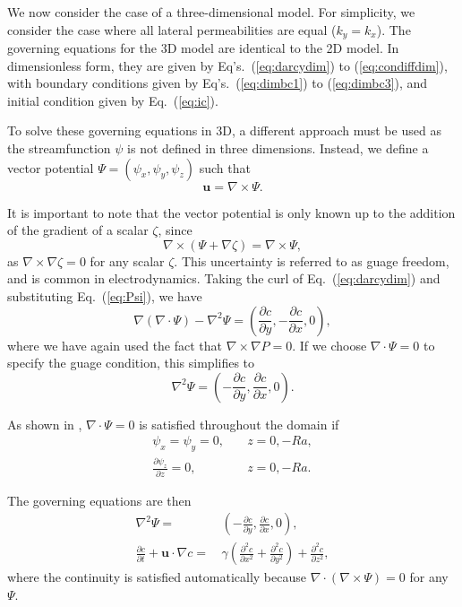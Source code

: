 \documentclass[11pt, a4paper]{csiroreport2012}
\begin{document}
We now consider the case of a three-dimensional model. For simplicity, we consider the case where all lateral permeabilities are equal ($k_y = k_x$). The governing equations for the 3D model are identical to the 2D model. In dimensionless form, they are given by Eq's.~(\ref{eq:darcydim}) to (\ref{eq:condiffdim}), with boundary conditions given by Eq's.~(\ref{eq:dimbc1}) to (\ref{eq:dimbc3}), and initial condition given by Eq.~(\ref{eq:ic}).

To solve these governing equations in 3D, a different approach must be used as the streamfunction $\psi$ is not defined in three dimensions. Instead, we define a vector potential $\Psi = (\psi_x, \psi_y, \psi_z)$ such that
\begin{equation}
\mathbf{u} = \nabla \times \Psi.
\label{eq:Psi}
\end{equation}

It is important to note that the vector potential is only known up to the addition of the gradient of a scalar $\zeta$, since 
\begin{equation}
\nabla \times \left( \Psi + \nabla \zeta \right) = \nabla \times \Psi,
\end{equation}
as $\nabla \times \nabla \zeta = 0$ for any scalar $\zeta$. This uncertainty is referred to as guage freedom, and is common in electrodynamics. Taking the curl of Eq.~(\ref{eq:darcydim}) and substituting Eq.~(\ref{eq:Psi}), we have 
\begin{equation}
\nabla(\nabla \cdot \Psi) - \nabla^2 \Psi = \left(\frac{\partial c}{\partial y}, - \frac{\partial c}{\partial x}, 0\right),
\end{equation}
where we have again used the fact that $\nabla \times \nabla P = 0$. If we choose $\nabla \cdot \Psi = 0$ to specify the guage condition, this simplifies to
\begin{equation}
\nabla^2 \Psi = \left(-\frac{\partial c}{\partial y},  \frac{\partial c}{\partial x}, 0\right).
\label{eq:poisson}
\end{equation}

As shown in \cite{E1997}, $\nabla \cdot \Psi = 0$ is satisfied throughout the domain if 
\begin{align}
\psi_x = \psi_y = 0,& \quad z = 0, -Ra, \nonumber \\
\frac{\partial \psi_z}{\partial z} = 0, & \quad  z = 0, -Ra.
\end{align}

The governing equations are then 
\begin{align}
\nabla^2 \Psi = \,& \left(-\frac{\partial c}{\partial y}, \frac{\partial c}{\partial x}, 0 \right), \label{eq:darcy3d} \\
\frac{\partial c}{\partial t} + \mathbf{u} \cdot \nabla c = \, & \gamma \left( \frac{\partial^2 c}{\partial x^2} + \frac{\partial^2 c}{\partial y^2} \right) + \frac{\partial^2 c}{\partial z^2}, \label{eq:convdiff3d}
\end{align}
where the continuity is satisfied automatically because $\nabla \cdot \left( \nabla \times \Psi \right) = 0$ for any $\Psi$.
\end{document}
